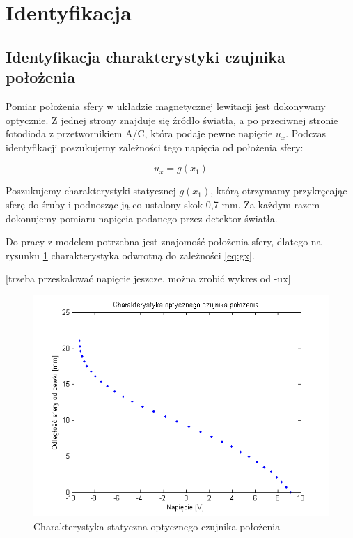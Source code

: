 \section{Identyfikacja}


\subsection{Identyfikacja charakterystyki czujnika położenia}

Pomiar położenia sfery w układzie magnetycznej lewitacji jest dokonywany optycznie. Z jednej strony znajduje się źródło światła, a po przeciwnej stronie fotodioda z przetwornikiem A/C, która podaje pewne napięcie $u_x$. Podczas identyfikacji poszukujemy zależności tego napięcia od położenia sfery:

\begin{equation} \label{eq:gx}
u_x = g(x_1)
\end{equation}

Poszukujemy charakterystyki statycznej $g(x_1)$, którą otrzymamy przykręcając sferę do śruby i podnosząc ją co ustalony skok 0,7 mm. Za każdym razem dokonujemy pomiaru napięcia podanego przez detektor światła.

Do pracy z modelem potrzebna jest znajomość położenia sfery, dlatego na rysunku \ref{img:gx} charakterystyka odwrotną do zależności \ref{eq:gx}.

[trzeba przeskalować napięcie jeszcze, można zrobić wykres od -ux]

\begin{figure}[!htb]
\centering
\includegraphics[scale=1]{img/czujnik_polozenia.png}
\caption{Charakterystyka statyczna optycznego czujnika położenia}
\label{img:gx}
\end{figure}


